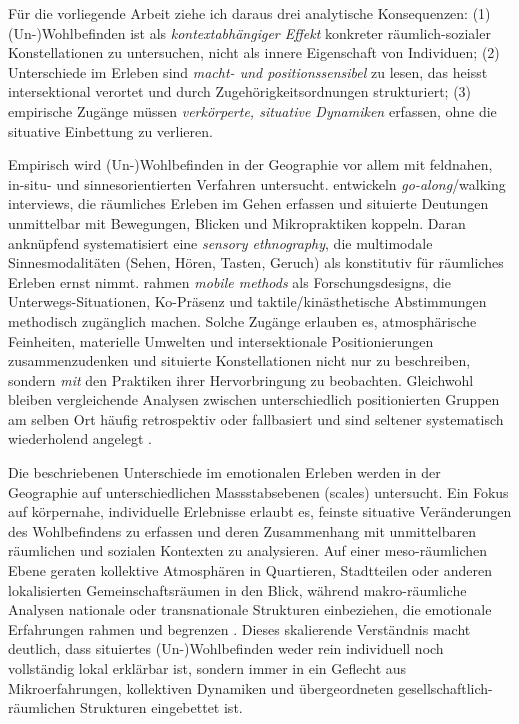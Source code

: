 Für die vorliegende Arbeit ziehe ich daraus drei analytische Konsequenzen: (1) (Un-)Wohlbefinden ist als \emph{kontextabhängiger Effekt} konkreter räumlich-sozialer Konstellationen zu untersuchen, nicht als innere Eigenschaft von Individuen; (2) Unterschiede im Erleben sind \emph{macht- und positionssensibel} zu lesen, das heisst intersektional verortet und durch Zugehörigkeitsordnungen strukturiert; (3) empirische Zugänge müssen \emph{verkörperte, situative Dynamiken} erfassen, ohne die situative Einbettung zu verlieren.

\vspace{1em}

Empirisch wird (Un-)Wohlbefinden in der Geographie vor allem mit feldnahen, in-situ- und sinnesorientierten Verfahren untersucht. \textcite{kusenbachStreetPhenomenologyGoAlong2003} entwickeln \emph{go-along}/walking interviews, die räumliches Erleben im Gehen erfassen und situierte Deutungen unmittelbar mit Bewegungen, Blicken und Mikropraktiken koppeln. Daran anknüpfend systematisiert \textcite{pinkDoingSensoryEthnography2009} eine \emph{sensory ethnography}, die multimodale Sinnesmodalitäten (Sehen, Hören, Tasten, Geruch) als konstitutiv für räumliches Erleben ernst nimmt. \textcite{buscherIntroductionMobileMethods2010} rahmen \emph{mobile methods} als Forschungsdesigns, die Unterwegs-Situationen, Ko-Präsenz und taktile/kinästhetische Abstimmungen methodisch zugänglich machen. Solche Zugänge erlauben es, atmosphärische Feinheiten, materielle Umwelten und intersektionale Positionierungen zusammenzudenken und situierte Konstellationen nicht nur zu beschreiben, sondern \emph{mit} den Praktiken ihrer Hervorbringung zu beobachten. Gleichwohl bleiben vergleichende Analysen zwischen unterschiedlich positionierten Gruppen am selben Ort häufig retrospektiv oder fallbasiert und sind seltener systematisch wiederholend angelegt \textcite{hoSocialGeographyIII2024}.

Die beschriebenen Unterschiede im emotionalen Erleben werden in der Geographie auf unterschiedlichen Massstabsebenen (scales) untersucht. Ein Fokus auf körpernahe, individuelle Erlebnisse erlaubt es, feinste situative Veränderungen des Wohlbefindens zu erfassen und deren Zusammenhang mit unmittelbaren räumlichen und sozialen Kontexten zu analysieren. Auf einer meso-räumlichen Ebene geraten kollektive Atmosphären in Quartieren, Stadtteilen oder anderen lokalisierten Gemeinschaftsräumen in den Blick, während makro-räumliche Analysen nationale oder transnationale Strukturen einbeziehen, die emotionale Erfahrungen rahmen und begrenzen \parencite{howittScaleRelationMusical1998,marstonHumanGeographyScale2005}. Dieses skalierende Verständnis macht deutlich, dass situiertes (Un-)Wohlbefinden weder rein individuell noch vollständig lokal erklärbar ist, sondern immer in ein Geflecht aus Mikroerfahrungen, kollektiven Dynamiken und übergeordneten gesellschaftlich-räumlichen Strukturen eingebettet ist.

